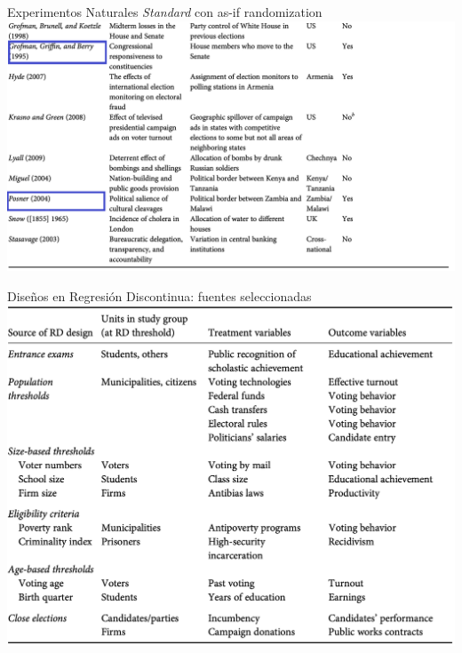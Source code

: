 \documentclass[
  ignorenonframetext,
]{beamer}
\begin{document}
\begin{frame}{Experimentos Naturales \textit{Standard} con as-if
randomization}
\protect\hypertarget{experimentos-naturales-con-as-if-randomization-1}{}
\includegraphics{figs/nat_exp_standard3.png}
\end{frame}

\begin{frame}{Diseños en Regresión Discontinua: fuentes seleccionadas}
\protect\hypertarget{diseuxf1os-en-regresiuxf3n-discontinua-fuentes-seleccionadas}{}
\includegraphics{figs/nat_exp_RDD1.png}
\end{frame}
\end{document}

